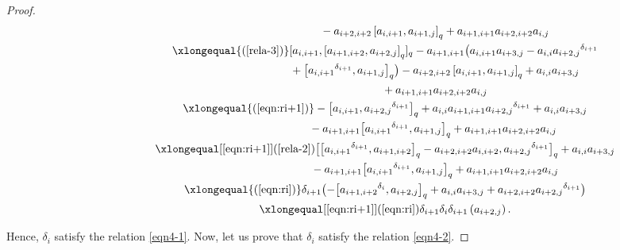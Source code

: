 \documentclass[pdftex]{sigma}
\numberwithin{equation}{section}
\def\lr#1{\left[#1\right]}
\def\lrb#1{\left(#1\right)}
\def\d{\delta}
\begin{document}
\begin{proof}
\begin{gather*}
 \phantom{ \d_i\d_{i+1}\d_i\lrb{a_{i+2,j}}\xlongequal{\qquad}}{} -a_{i+2,i+2}\lr{a_{i,i+1}, a_{i+1,j}}_q+a_{i+1,i+1}a_{i+2,i+2}a_{i,j}\\
 \phantom{ \d_i\d_{i+1}\d_i\lrb{a_{i+2,j}}}{}\xlongequal{\lrb{\ref{rela-3}}} [a_{i,i+1},\lr{a_{i+1,i+2}, a_{i+2,j}}_q]_q -a_{i+1,i+1} \bigl(a_{i,i+1}a_{i+3,j} -a_{i,i}{a_{i+2,j}}^{\d_{i+1}} \\
 \phantom{ \d_i\d_{i+1}\d_i\lrb{a_{i+2,j}}\xlongequal{\qquad}}{} + \bigl[{a_{i,i+1}}^{\d_{i+1}}, a_{i+1,j} \bigr]_q \bigr)-a_{i+2,i+2}\lr{a_{i,i+1}, a_{i+1,j}}_q +a_{i,i}a_{i+3,j} \\
 \phantom{ \d_i\d_{i+1}\d_i\lrb{a_{i+2,j}}\xlongequal{\qquad}}{} +a_{i+1,i+1}a_{i+2,i+2}a_{i,j}\\
 \phantom{ \d_i\d_{i+1}\d_i\lrb{a_{i+2,j}}}{}\xlongequal{\lrb{\ref{eqn:ri+1}}} -\bigl[a_{i,i+1},{a_{i+2,j}}^{\d_{i+1}}\bigr]_q +a_{i,i}a_{i+1,i+1}{a_{i+2,j}}^{\d_{i+1}} +a_{i,i}a_{i+3,j} \\
 \phantom{ \d_i\d_{i+1}\d_i\lrb{a_{i+2,j}}\xlongequal{\qquad}\!\!}{} -a_{i+1,i+1}\bigl[ {a_{i,i+1}}^{\d_{i+1}}, a_{i+1,j}\bigr]_q+a_{i+1,i+1}a_{i+2,i+2}a_{i,j}\\
 \phantom{ \d_i\d_{i+1}\d_i\lrb{a_{i+2,j}}}{} \xlongequal[\eqref{eqn:ri+1}]{\lrb{\ref{rela-2}}} \bigl[\bigl[{a_{i,i+1}}^{\d_{i+1}}, a_{i+1,i+2}\bigr]_q-a_{i+2,i+2}a_{i,i+2}, {a_{i+2,j}}^{\d_{i+1}}\bigr]_q +a_{i,i}a_{i+3,j} \\
 \phantom{ \d_i\d_{i+1}\d_i\lrb{a_{i+2,j}}\xlongequal{\qquad}}{} -a_{i+1,i+1}\bigl[ {a_{i,i+1}}^{\d_{i+1}}, a_{i+1,j}\bigr]_q +a_{i+1,i+1}a_{i+2,i+2}a_{i,j}\\
 \phantom{ \d_i\d_{i+1}\d_i\lrb{a_{i+2,j}}}{} \xlongequal{\lrb{\ref{eqn:ri}}} \d_{i+1}\bigl(-\bigl[{a_{i+1,i+2}}^{\d_{i}}, a_{i+2,j}\bigr]_q+a_{i,i}a_{i+3,j}+a_{i+2,i+2} {a_{i+2,j}}^{\d_{i+1}}\bigr)\\
 \phantom{ \d_i\d_{i+1}\d_i\lrb{a_{i+2,j}}}{}\xlongequal[\eqref{eqn:ri+1}]{\lrb{\ref{eqn:ri}}} \d_{i+1}\d_i\d_{i+1}
\lrb{a_{i+2,j}}.
\end{gather*}

Hence, $\d_i$ satisfy the relation \eqref{eqn4-1}.
Now, let us prove that $\d_i$ satisfy the relation \eqref{eqn4-2}.


\end{proof}
\end{document}

